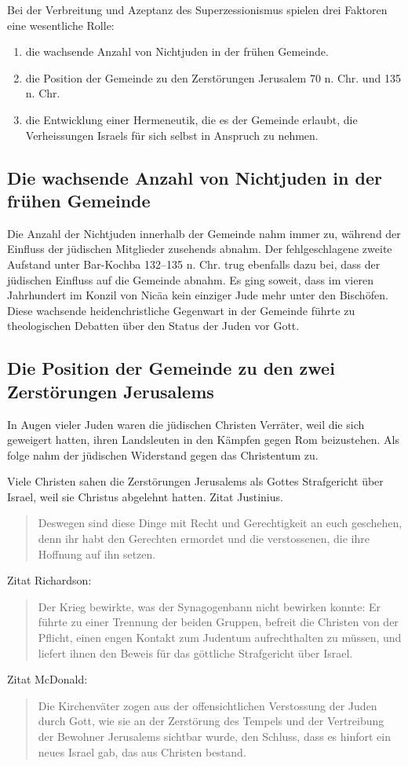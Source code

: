 \documentclass{../../inc/mybib}
\newcommand{\sz}{Superzessionismus}
\begin{document}
    Bei der Verbreitung und Azeptanz des \sz{} spielen drei Faktoren eine wesentliche Rolle:
    \begin{enumerate}
        \item die wachsende Anzahl von Nichtjuden in der frühen Gemeinde.
        \item die Position der Gemeinde zu den Zerstörungen Jerusalem 70 n. Chr. und 135 n. Chr.
        \item die Entwicklung einer Hermeneutik, die es der Gemeinde erlaubt, die Verheissungen Israels für sich selbst in Anspruch zu nehmen.
    \end{enumerate}
    \subsection{Die wachsende Anzahl von Nichtjuden in der frühen Gemeinde}
    Die Anzahl der Nichtjuden innerhalb der Gemeinde nahm immer zu, während der Einfluss der jüdischen Mitglieder zusehends abnahm. Der fehlgeschlagene zweite Aufstand unter Bar-Kochba 132--135 n. Chr. trug ebenfalls dazu bei, dass der jüdischen Einfluss auf die Gemeinde abnahm. Es ging soweit, dass im vieren Jahrhundert im Konzil von Nicäa kein einziger Jude mehr unter den Bischöfen. Diese wachsende heidenchristliche Gegenwart in der Gemeinde führte zu theologischen Debatten über den Status der Juden vor Gott.
    \subsection{Die Position der Gemeinde zu den zwei Zerstörungen Jerusalems}
    In Augen vieler Juden waren die jüdischen Christen Verräter, weil die sich geweigert hatten, ihren Landsleuten in den Kämpfen gegen Rom beizustehen. Als folge nahm der jüdischen Widerstand gegen das Christentum zu.

    Viele Christen sahen die Zerstörungen Jerusalems als Gottes Strafgericht über Israel, weil sie Christus abgelehnt hatten. Zitat Justinius.
    \begin{quote}
        Deswegen sind diese Dinge mit Recht und Gerechtigkeit an euch geschehen, denn ihr habt den Gerechten ermordet und die verstossenen, die ihre Hoffnung auf ihn setzen.
    \end{quote}
    Zitat Richardson:
    \begin{quote}
        Der Krieg bewirkte, was der Synagogenbann nicht bewirken konnte: Er führte zu einer Trennung der beiden Gruppen, befreit die Christen von der Pflicht, einen engen Kontakt zum Judentum aufrechthalten zu müssen, und liefert ihnen den Beweis für das göttliche Strafgericht über Israel.
    \end{quote}
    Zitat McDonald:
    \begin{quote}
        Die Kirchenväter zogen aus der offensichtlichen Verstossung der Juden durch Gott, wie sie an der Zerstörung des Tempels und der Vertreibung der Bewohner Jerusalems sichtbar wurde, den Schluss, dass es hinfort ein neues Israel gab, das aus Christen bestand.
    \end{quote}
\end{document}
